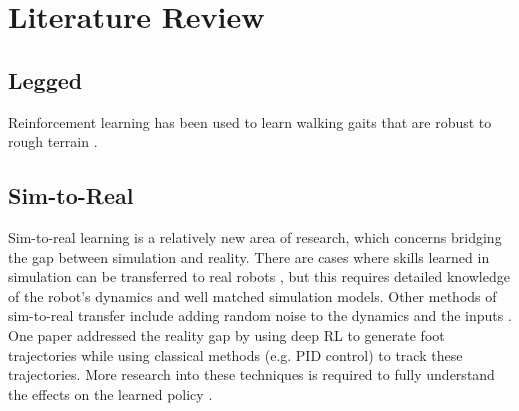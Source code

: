 \chapter{Literature Review}

\section{Legged}

Reinforcement learning has been used to learn walking gaits that are robust to rough terrain \cite{lee_learning_2020}.


\section{Sim-to-Real}

Sim-to-real learning is a relatively new area of research, which concerns bridging the gap between simulation and reality. There are cases where skills learned in simulation can be transferred to real robots \cite{neunert_why_2016, kaspar_sim2real_2020}, but this requires detailed knowledge of the robot's dynamics and well matched simulation models. Other methods of sim-to-real transfer include adding random noise to the dynamics \cite{peng_sim--real_2018,zhao_sim--real_2020} and the inputs \cite{lee_robust_2019}. One paper addressed the reality gap by using deep RL to generate foot trajectories while using classical methods (e.g. PID control) to track these trajectories.  More research into these techniques is required to fully understand the effects on the learned policy \cite{zhao_sim--real_2020}. 

